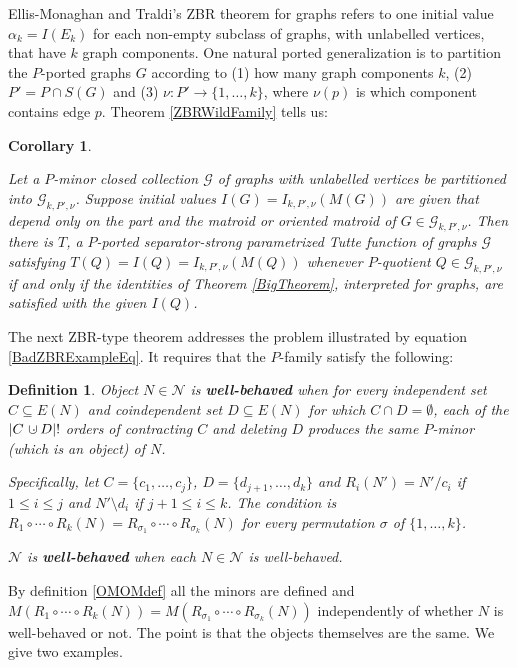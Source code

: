 \documentclass[12pt,leqno]{amsart}
\newtheorem{cor}[lem]{Corollary}
\newtheorem{definition}[lem]{Definition}
\theoremstyle{remark}
\newcommand{\dunion}
{\mbox{\hbox{\hskip6pt$\cdot$\hskip-5.50pt$\cup$\hskip2pt}}}
\begin{document}
Ellis-Monaghan and Traldi's ZBR theorem for graphs 
refers to one initial value $\mathcal{\alpha}_k=I(E_k)$
for each non-empty subclass of graphs, with unlabelled vertices, that
have $k$ graph components.  One natural ported generalization
is to partition the $P$-ported graphs $G$
according to (1) how many
graph components $k$, (2) $P'=P\cap S(G)$ and (3)
$\nu:P'\rightarrow\{1,\ldots,k\}$, where $\nu(p)$ is which
component contains edge $p$.  Theorem
\ref{ZBRWildFamily} tells us:

\begin{cor}
\label{PZBRGraphCor1}

Let a $P$-minor closed collection $\mathcal{G}$ of graphs with unlabelled
vertices be partitioned into $\mathcal{G}_{k,P',\nu}$.  Suppose initial
values $I(G)=I_{k,P',\nu}(M(G))$ are given that depend only on the 
part and the matroid or oriented matroid of $G\in\mathcal{G}_{k,P',\nu}$.
Then there is $T$, 
a $P$-ported separator-strong parametrized Tutte function
of graphs $\mathcal{G}$ satisfying $T(Q)=I(Q)=I_{k,P',\nu}(M(Q))$ whenever
$P$-quotient $Q\in\mathcal{G}_{k,P',\nu}$ if and only if the identities
of Theorem \ref{BigTheorem}, interpreted for graphs, are satisfied with 
the given $I(Q)$.
\end{cor}

The next ZBR-type theorem  addresses the problem 
illustrated by equation \eqref{BadZBRExampleEq}. It requires that
the $P$-family satisfy the following:

\begin{definition}
Object $N\in\mathcal{N}$ is \textbf{well-behaved} when
for every independent set $C\subseteq E(N)$ and
coindependent set $D\subseteq E(N)$ for which
$C\cap D=\emptyset$, each of the
$|C\dunion D|!$ orders 
of contracting $C$ and deleting $D$ produces the
same $P$-minor (which is an object) of $N$.

Specifically, let 
$C=\{c_1,\ldots,c_j\}$,
$D=\{d_{j+1},\ldots,d_k\}$
and $R_i(N')=N'/c_i$ if $1\le i \le j$
and $N'\setminus d_i$ if $j+1\le i \le k$.
The condition is 
$R_1\circ\cdots\circ R_k(N) = R_{\sigma_1}\circ\cdots\circ R_{\sigma_k}(N)$
for every permutation $\sigma$ of $\{1,\ldots,k\}$.

$\mathcal{N}$ is \textbf{well-behaved} when 
each $N\in\mathcal{N}$ is well-behaved.

\end{definition}

By definition \ref{OMOMdef} 
all the minors are defined and
$M(R_1\circ\cdots\circ R_k(N)) = M(R_{\sigma_1}\circ\cdots\circ R_{\sigma_k}(N))$
independently of whether $N$ is well-behaved or not.
The point is that the objects themselves are the same.
We give two examples.
\end{document}
